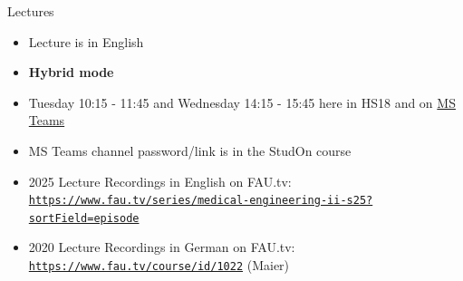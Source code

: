 \begin{frame}[c]{Lectures}
	\begin{itemize}
		\setlength\itemsep{0.4cm}
		\item Lecture is in English
		\item \textbf{Hybrid mode}
		\item Tuesday 10:15 - 11:45 and Wednesday 14:15 - 15:45 here in HS18 and on \href{https://teams.microsoft.com/l/team/19\%3adRCxup9jUsjM31xr9T4jdAFDB-ImEk_lU5Fy05ijYx81\%40thread.tacv2/conversations?groupId=6b2df36b-cec0-46b3-83d2-b4e6d1c6ac30\&tenantId=b2efcef3-8496-40b8-9de8-f135982f3461}{MS Teams}
		\item MS Teams channel password/link is in the StudOn course
		\item 2025 Lecture Recordings in English on FAU.tv:\\
		\texttt{\url{https://www.fau.tv/series/medical-engineering-ii-s25?sortField=episode}}\\
		\item 2020 Lecture Recordings in German on FAU.tv:\\
		\texttt{\url{https://www.fau.tv/course/id/1022}} (Maier)
	\end{itemize}
\end{frame}

